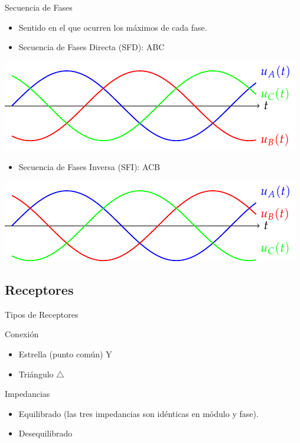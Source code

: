 \documentclass[xcolor={usenames,svgnames,dvipsnames}]{beamer}
\begin{document}
\begin{frame}[label={sec:org8d43a38}]{Secuencia de Fases}
\begin{itemize}
\item Sentido en el que ocurren los máximos de cada fase.
\item Secuencia de Fases Directa (\alert{SFD}): ABC
\end{itemize}
\begin{center}
\includegraphics[height=0.3\textheight]{figs/TensionesTrifasica_ABC.pdf}
\end{center}
\begin{itemize}
\item Secuencia de Fases Inversa (\alert{SFI}): ACB
\end{itemize}
\begin{center}
\includegraphics[height=0.3\textheight]{figs/TensionesTrifasica_ACB.pdf}
\end{center}
\end{frame}

\subsection{Receptores}
\label{sec:org546f9b1}
\begin{frame}[label={sec:org4249eb3}]{Tipos de Receptores}
\begin{block}{Conexión}
\begin{itemize}
\item \alert{Estrella} (punto común) Y
\item \alert{Triángulo} \(\triangle\)
\end{itemize}
\end{block}

\begin{block}{Impedancias}
\begin{itemize}
\item \alert{Equilibrado} (las tres impedancias son idénticas en módulo \alert{y} fase).
\item \alert{Desequilibrado}
\end{itemize}
\end{block}
\end{frame}
\end{document}

